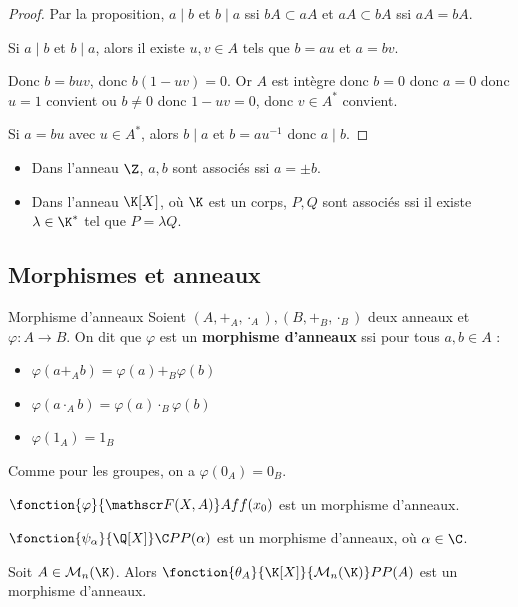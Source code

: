 \begin{proof}
    Par la proposition, $a \mid b$ et $b \mid a$ ssi $bA \subset aA$ et $aA \subset bA$ ssi 
    $aA = bA$.

    Si $a \mid b$ et $b \mid a$, alors il existe $u, v \in A$ tels que
    $b = au$ et $a = bv$. 

    Donc $b = buv$, donc $b(1 - uv) = 0$. Or $A$ est intègre donc 
    $b = 0$ donc $a = 0$ donc $u = 1$ convient ou $b \neq 0$ donc $1 - uv = 0$, donc $v \in A^*$ convient. 

    Si $a = bu$ avec $u \in A^*$, alors $b \mid a $ et $b = au^{-1}$ donc $a \mid b$.
\end{proof}

\begin{exemple}
    \begin{itemize}
        \item Dans l'anneau $\Z$, $a, b$ sont associés ssi $a = \pm b$.

        \item Dans l'anneau $\K[X]$, où $\K$ est un corps, $P, Q$ sont associés ssi
        il existe $\lambda \in \K^*$ tel que $P = \lambda Q$.
    \end{itemize}
\end{exemple}

\subsection{Morphismes et anneaux}

\begin{definition}{Morphisme d'anneaux}{}
    Soient $(A, +_A, \cdot_A), (B, +_B, \cdot_B)$ deux anneaux et $\varphi : A \to B$. On dit que $\varphi$ est un
    \textbf{morphisme d'anneaux} ssi pour tous $a, b \in A$ :
    \begin{itemize}
        \item $\varphi(a +_A b) = \varphi(a) +_B \varphi(b)$
        \item $\varphi(a \cdot_A b) = \varphi(a) \cdot_B \varphi(b)$
        \item $\varphi(1_A) = 1_B$
    \end{itemize}
\end{definition}

\begin{remarque}
    Comme pour les groupes, on a $\varphi(0_A) = 0_B$.
\end{remarque}

\begin{exemple}
    $\fonction{\varphi}{\mathscr F(X, A)} A f {f(x_0)}$ est un morphisme d'anneaux. 

    \avspace 
    $\fonction{\psi_{\alpha}}{\Q [X]} \C P {P(\alpha)}$ est un morphisme d'anneaux, où $\alpha \in \C$.

    Soit $A \in \mathcal M_n(\K)$. Alors $\fonction {\theta_A}{\K[X]}{\mathcal M_n(\K)} P {P(A)}$ est un morphisme d'anneaux.
\end{exemple}

